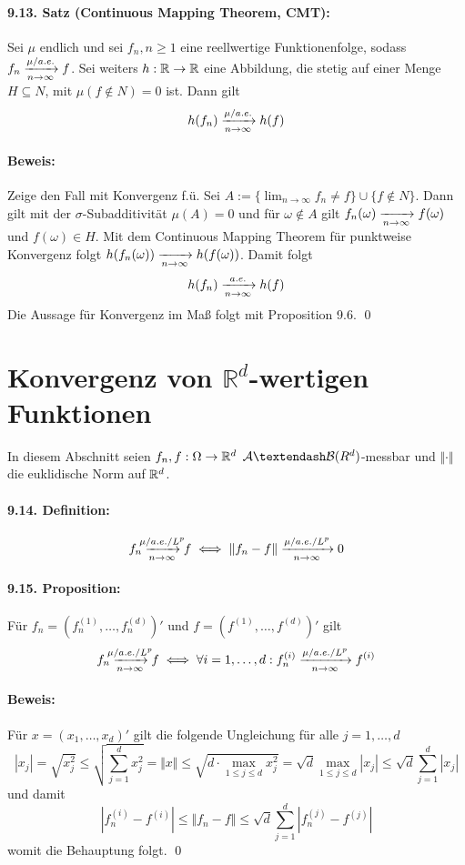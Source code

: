 \paragraph{9.13. Satz (Continuous Mapping Theorem, CMT):}Sei $\mu$ endlich und sei $f_n,n\geq1$ eine reellwertige Funktionenfolge, sodass $f_n\nto{\mu/a.e.}{n\to\infty}f$. Sei weiters $h:\mathbb{R}\to\mathbb{R}$ eine Abbildung, die stetig auf einer Menge $H\subseteq N$, mit $\mu(f\notin N)=0$ ist. Dann gilt
$$h(f_n)\nto{\mu/a.e.}{n\to\infty}h(f)$$

\paragraph{Beweis:}Zeige den Fall mit Konvergenz f.\"u. Sei $A:=\{\lim_{n\to\infty}f_n\neq f\}\cup\{f\notin N\}$. Dann gilt mit der $\sigma$-Subadditivit\"at $\mu(A)=0$ und f\"ur $\omega\notin A$ gilt $f_n(\omega)\nto{}{n\to\infty} f(\omega)$ und $f(\omega)\in H$. Mit dem Continuous Mapping Theorem f\"ur punktweise Konvergenz folgt $h(f_n(\omega))\nto{}{n\to\infty}h(f(\omega))$. Damit folgt 
$$h(f_n)\nto{a.e.}{n\to\infty}h(f)$$
Die Aussage f\"ur Konvergenz im Ma\ss{} folgt mit Proposition 9.6. \qed


\section*{Konvergenz von $\mathbb{R}^d$-wertigen Funktionen}
In diesem Abschnitt seien $f_n,f:\Omega\to\mathbb{R}^d$ $\A\textendash \mathcal{B}(R^d)$-messbar und $\Vert\cdot\Vert$ die euklidische Norm auf $\mathbb{R}^d$.

\paragraph{9.14. Definition:}
$$f_n\nto{\mu/a.e./L^p}{n\to\infty}f\iff\Vert f_n-f\Vert\xrightarrow[n\to\infty]{\makebox[3.5em][c]{$\scriptstyle\mu/a.e./L^p$}}0$$

\paragraph{9.15. Proposition:}F\"ur $f_n=\left(f_n^{(1)},\hdots,f_n^{(d)}\right)'$ und $f=\left(f^{(1)},\hdots,f^{(d)}\right)'$ gilt
$$f_n\nto{\mu/a.e./L^p}{n\to\infty}f\iff\forall i=1,\hdots,d:f_n^{(i)}\xrightarrow[n\to\infty]{\makebox[3.5em][c]{$\scriptstyle\mu/a.e./L^p$}}f^{(i)}$$

\paragraph{Beweis:} F\"ur $x=(x_1,\hdots,x_d)'$ gilt die folgende Ungleichung f\"ur alle $j=1,\hdots,d$
$$|x_j|=\sqrt{x_j^2}\leq\sqrt{\sum_{j=1}^dx_j^2}=\Vert x\Vert\leq\sqrt{d\cdot\max_{1\leq j\leq d}x_j^2}=\sqrt{d}\max_{1\leq j\leq d}|x_j|\leq\sqrt{d}\sum_{j=1}^d|x_j|$$
und damit
$$|f_n^{(i)}-f^{(i)}|\leq\Vert f_n-f\Vert\leq\sqrt{d}\sum_{j=1}^d|f_n^{(j)}-f^{(j)}|$$
womit die Behauptung folgt. \qed


